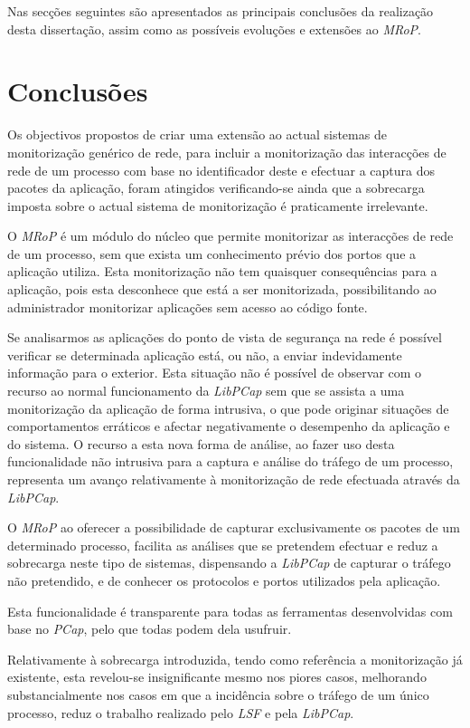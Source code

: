 Nas secções seguintes são apresentados as principais conclusões da realização desta dissertação, assim como as possíveis evoluções e extensões ao \textit{MRoP}.

\section{Conclusões}
\label{sec:conclusoes}

Os objectivos propostos de criar uma extensão ao actual sistemas de monitorização genérico de rede, para incluir a monitorização das interacções de rede de um processo com base no identificador deste e efectuar a captura dos pacotes da aplicação, foram atingidos verificando-se ainda que a sobrecarga imposta sobre o actual sistema de monitorização é praticamente irrelevante.

O \textit{MRoP} é um módulo do núcleo que permite monitorizar as interacções de rede de um processo, sem que exista um conhecimento prévio dos portos que a aplicação utiliza.
Esta monitorização não tem quaisquer consequências para a aplicação, pois esta desconhece que está a ser monitorizada, possibilitando ao administrador monitorizar aplicações sem acesso ao código fonte.

Se analisarmos as aplicações do ponto de vista de segurança na rede é possível verificar se determinada aplicação está, ou não, a enviar indevidamente informação para o exterior.
Esta situação não é possível de observar com o recurso ao normal funcionamento da \textit{LibPCap} sem que se assista a uma monitorização da aplicação de forma intrusiva, o que pode originar situações de comportamentos erráticos e afectar negativamente o desempenho da aplicação e do sistema.
O recurso a esta nova forma de análise, ao fazer uso desta funcionalidade não intrusiva para a captura e análise do tráfego de um processo, representa um avanço relativamente à monitorização de rede efectuada através da \textit{LibPCap}.

O \textit{MRoP} ao oferecer a possibilidade de capturar exclusivamente os pacotes de um determinado processo, facilita as análises que se pretendem efectuar e reduz a sobrecarga neste tipo de sistemas, dispensando a \textit{LibPCap} de capturar o tráfego não pretendido, e de conhecer os protocolos e portos utilizados pela aplicação.

Esta funcionalidade é transparente para todas as ferramentas desenvolvidas com base no \textit{PCap}, pelo que todas podem dela usufruir.

Relativamente à sobrecarga introduzida, tendo como referência a monitorização já existente, esta revelou-se insignificante mesmo nos piores casos, melhorando substancialmente nos casos em que a incidência sobre o tráfego de um único processo, reduz o trabalho realizado pelo \textit{LSF} e pela \textit{LibPCap}.

